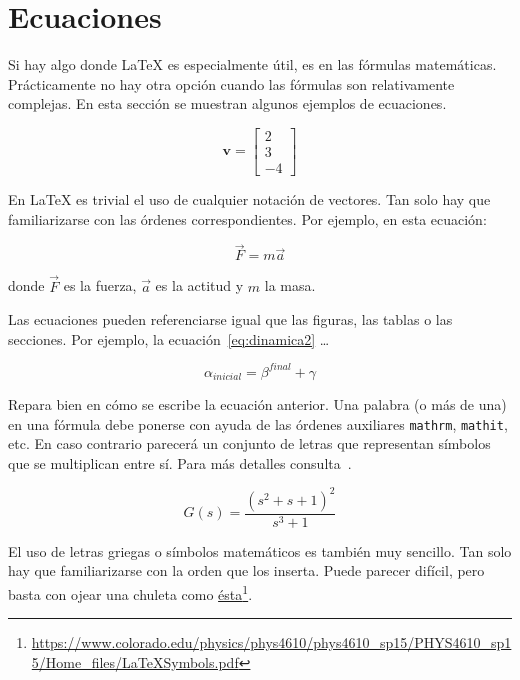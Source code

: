 \section{Ecuaciones} 
\label{sec:ecuaciones}

Si hay algo donde \LaTeX{} es especialmente útil, es en las fórmulas matemáticas.  Prácticamente no hay otra opción cuando las fórmulas son relativamente complejas.  En esta sección se muestran algunos ejemplos de ecuaciones.

\begin{equation}
    \mathbf{v} = \left[
    \begin{array}{c}
        2 \\
        3 \\
        -4 
    \end{array}
    \right]
\end{equation}

En \LaTeX{} es trivial el uso de cualquier notación de vectores.  Tan solo hay que familiarizarse con las órdenes correspondientes.  Por ejemplo, en esta ecuación:

\begin{equation} 
\vec{F} = m \vec{a}
\label{eq:dinamica}
\end{equation}

\noindent donde $\vec{F}$ es la fuerza, $\vec{a}$ es la actitud y $m$ la masa.

Las ecuaciones pueden referenciarse igual que las figuras, las tablas o las secciones.  Por ejemplo, la ecuación~\ref{eq:dinamica2} \ldots

\begin{equation} 
\alpha_{\mathit{inicial}} = \beta^{\mathit{final}} + \gamma
\label{eq:dinamica2}
\end{equation}

Repara bien en cómo se escribe la ecuación anterior.  Una palabra (o más de una) en una fórmula debe ponerse con ayuda de las órdenes auxiliares \texttt{mathrm}, \texttt{mathit}, etc.  En caso contrario parecerá un conjunto de letras que representan símbolos que se multiplican entre sí.  Para más detalles consulta~\cite{andrewroberts2004}.

\begin{equation}
G(s)=\frac{(s^2+s+1)^2}{s^3+1}
\label{eq:dinamica3}
\end{equation}

El uso de letras griegas o símbolos matemáticos es también muy sencillo.  Tan solo hay que familiarizarse con la orden que los inserta.  Puede parecer difícil, pero basta con ojear una chuleta como \href{https://www.colorado.edu/physics/phys4610/phys4610_sp15/PHYS4610_sp15/Home_files/LaTeXSymbols.pdf}{ésta}\footnote{\url{https://www.colorado.edu/physics/phys4610/phys4610_sp15/PHYS4610_sp15/Home_files/LaTeXSymbols.pdf}}.

